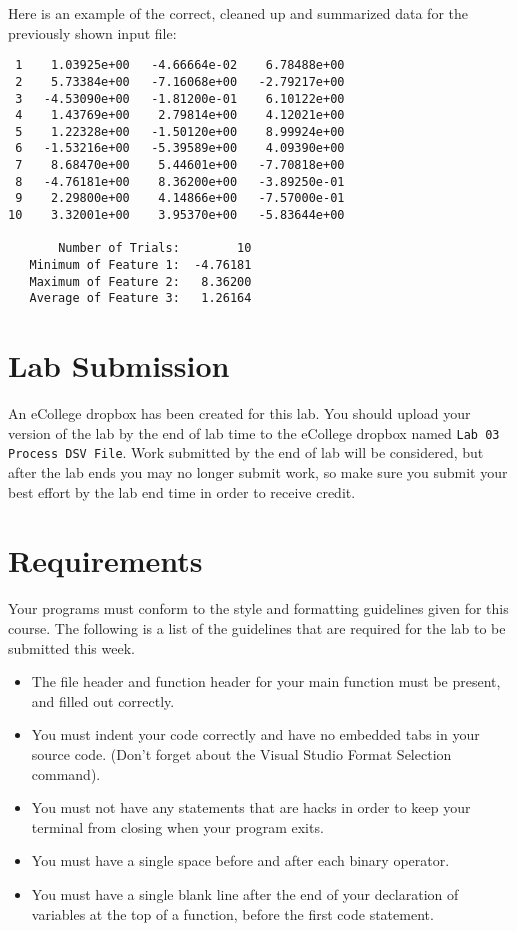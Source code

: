 \documentclass[11pt]{article}
\begin{document}
Here is an example of the correct, cleaned up and summarized data for
the previously shown input file:

\begin{verbatim}
 1    1.03925e+00   -4.66664e-02    6.78488e+00
 2    5.73384e+00   -7.16068e+00   -2.79217e+00
 3   -4.53090e+00   -1.81200e-01    6.10122e+00
 4    1.43769e+00    2.79814e+00    4.12021e+00
 5    1.22328e+00   -1.50120e+00    8.99924e+00
 6   -1.53216e+00   -5.39589e+00    4.09390e+00
 7    8.68470e+00    5.44601e+00   -7.70818e+00
 8   -4.76181e+00    8.36200e+00   -3.89250e-01
 9    2.29800e+00    4.14866e+00   -7.57000e-01
10    3.32001e+00    3.95370e+00   -5.83644e+00

       Number of Trials:        10
   Minimum of Feature 1:  -4.76181
   Maximum of Feature 2:   8.36200
   Average of Feature 3:   1.26164
\end{verbatim}

\section*{Lab Submission}
\label{sec-4}

An eCollege dropbox has been created for this lab.  You should
upload your version of the lab by the end of lab time to the eCollege
dropbox named \verb~Lab 03 Process DSV File~.  Work submitted by the end
of lab will be considered, but after the lab ends you may no longer
submit work, so make sure you submit your best effort by the lab end
time in order to receive credit.
\section*{Requirements}
\label{sec-5}
Your programs must conform to the style and formatting guidelines given for this course.
The following is a list of the guidelines that are required for the lab to be submitted
this week.

\begin{itemize}
\item The file header and function header for your main function must be present, and filled out correctly.
\item You must indent your code correctly and have no embedded tabs in your source code. (Don't forget about the Visual Studio Format Selection command).
\item You must not have any statements that are hacks in order to keep your terminal from closing when your program exits.
\item You must have a single space before and after each binary operator.
\item You must have a single blank line after the end of your declaration
of variables at the top of a function, before the first code
statement.
\end{itemize}
\end{document}
